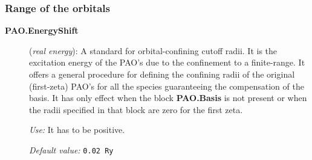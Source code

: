 \documentclass[11pt]{article}
\begin{document}
\subsubsection{Range of the orbitals}

\begin{description}
\item[{\bf PAO.EnergyShift}] ({\it real energy}): A standard for 
orbital-confining cutoff radii. It is the excitation energy
of the PAO's due to the confinement to a finite-range. It offers a
general procedure for defining the confining radii of the original
(first-zeta) PAO's for all the species guaranteeing the compensation 
of the basis. It has only effect when the block
{\bf PAO.Basis} is not present or when the radii
specified in that block are zero for the first zeta.

{\it Use:} It has to be positive.

{\it Default value:} {\tt 0.02 Ry}

\end{description}
\end{document}
